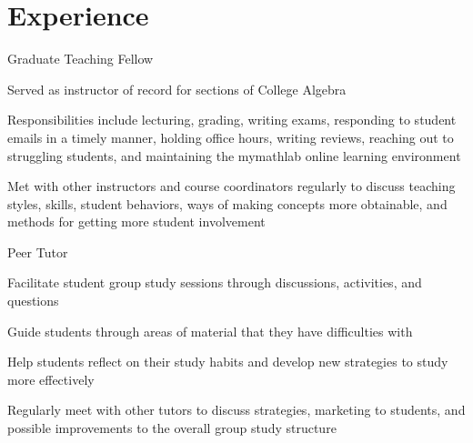 \section{\textbf{Experience}}
  \resumeSubHeadingListStart
    \resumeSubheading
      {Graduate Teaching Fellow}{}
      \vspace{-2.0mm}
      \resumeItemListStart
    \item { Served as instructor of record for sections of College Algebra}
    \item { Responsibilities include lecturing, grading, writing exams, responding to student emails in a timely manner, 
    holding office hours, writing reviews, reaching out to struggling students, and maintaining the mymathlab 
    online learning environment}
    \item { Met with other instructors and course coordinators regularly to discuss teaching styles, skills, student 
    behaviors, ways of making concepts more obtainable, and methods for getting more student involvement}
    \resumeItemListEnd
    
    \vspace{-3.0mm}
    
    \resumeSubheading
      {Peer Tutor}{}
      \vspace{-2.0mm}
      \resumeItemListStart
    \item {Facilitate student group study sessions through discussions, activities, and questions}
    \item {Guide students through areas of material that they have difficulties with}
    \item {Help students reflect on their study habits and develop new strategies to study more effectively}
    \item {Regularly meet with other tutors to discuss strategies, marketing to students, and possible improvements 
    to the overall group study structure}
    \resumeItemListEnd
      
  \resumeSubHeadingListEnd




